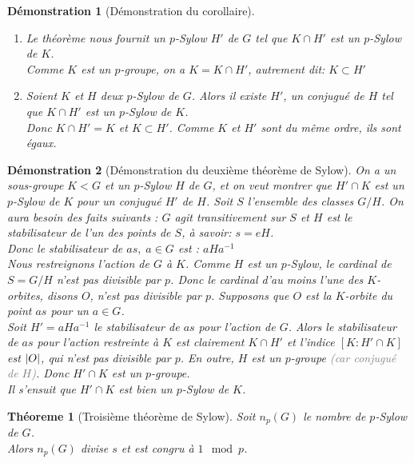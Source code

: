 \documentclass[a4paper, oneside]{report}
\theoremstyle{break}
\newtheorem{thm}{Théoreme}[section] %
\newtheorem*{demonstration}{Démonstration}
\newcommand{\gray}[1]{\textcolor{gray}{#1}}
\DeclarePairedDelimiter\abs{\lvert}{\rvert}%
\begin{document}
\begin{demonstration}[Démonstration du corollaire]
\begin{enumerate}
\item  Le théorème nous fournit un $p$-Sylow $H'$ de $G$ tel que $K \cap H'$ est un $p$-Sylow de $K$.\\
Comme $K$ est un $p$-groupe, on a $K = K \cap H'$, autrement dit: $K \subset H'$

\medbreak

\item  Soient $K$ et $H$ deux $p$-Sylow de $G$. Alors il existe $H'$, un conjugué de $H$ tel que $K \cap H'$ est un $p$-Sylow de $K$.\\
Donc $K \cap H' = K$ et $K \subset H'$. Comme $K$ et $H'$ sont du même ordre, ils sont égaux.

\end{enumerate}
\end{demonstration}

\begin{demonstration}[Démonstration du deuxième théorème de Sylow]
On a un sous-groupe $K < G$ et un $p$-Sylow $H$ de $G$, et on veut montrer que $H' \cap K$ est un $p$-Sylow de $K$ pour un conjugué $H'$ de $H$.
\medbreak
Soit $S$ l'ensemble des classes $G/H$. On aura besoin des faits suivants : $G$ agit transitivement sur $S$ et $H$ est le stabilisateur de l'un des points de $S$, à savoir: $s = eH$.\\
Donc le stabilisateur de $as, \; a \in G$ est : $aHa^{-1}$\\
Nous restreignons l'action de $G$ à $K$. Comme $H$ est un $p$-Sylow, le cardinal de $S = G/H$ n'est pas divisible par $p$. Donc le cardinal d'au moins l'une des $K$-orbites, disons $O$, n'est pas divisible par $p$. Supposons que $O$ est la $K$-orbite du point $as$ pour un $a \in G$.\\
Soit $H' = aHa^{-1}$ le stabilisateur de $as$ pour l'action de $G$. Alors le stabilisateur de $as$ pour l'action restreinte à $K$ est clairement $K \cap H'$ et l'indice $[K : H' \cap K]$ est $\abs{O}$, qui n'est pas divisible par $p$. En outre, $H$ est un $p$-groupe \gray{(car conjugué de $H$)}. Donc $H' \cap K$ est un $p$-groupe.\\
Il s'ensuit que $H' \cap K$ est bien un $p$-Sylow de $K$.
\end{demonstration}

\begin{thm}[Troisième théorème de Sylow]
Soit $n_p(G)$ le nombre de $p$-Sylow de $G$.\\
Alors $n_p(G)$ divise $s$ et est congru à $1\mod p$.
\end{thm}
\end{document}
